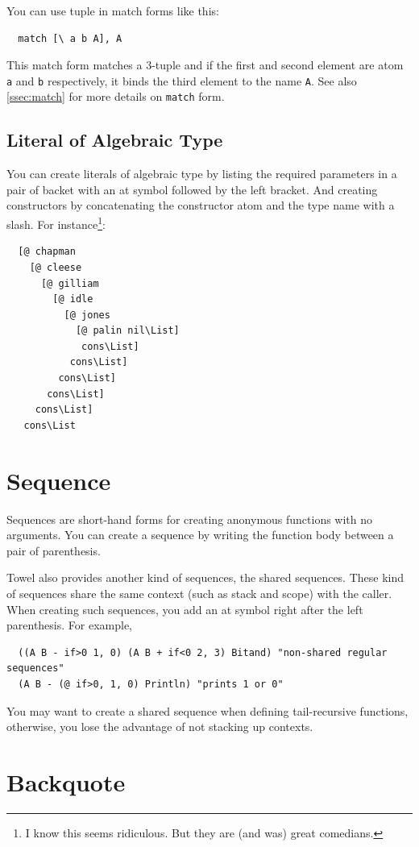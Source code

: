 \documentclass{book}
\begin{document}
You can use tuple in match forms like this:
\begin{verbatim}
  match [\ a b A], A
\end{verbatim}
This match form matches a 3-tuple and if the first and second element are atom \texttt{a} and \texttt{b} respectively, it binds the third element to the name \texttt{A}. See also \autoref{ssec:match} for more details on \texttt{match} form.

\subsection{Literal of Algebraic Type}

You can create literals of algebraic type by listing the required parameters in a pair of backet with an at symbol followed by the left bracket. And creating constructors by concatenating the constructor atom and the type name with a slash. For instance\footnote{I know this seems ridiculous. But they are (and was) great comedians.}:
\begin{verbatim}
  [@ chapman
    [@ cleese
      [@ gilliam
        [@ idle
          [@ jones
            [@ palin nil\List]
             cons\List]
           cons\List]
         cons\List]
       cons\List]
     cons\List]
   cons\List
\end{verbatim}

\section{Sequence}

Sequences are short-hand forms for creating anonymous functions with no arguments. You can create a sequence by writing the function body between a pair of parenthesis.

Towel also provides another kind of sequences, the shared sequences. These kind of sequences share the same context (such as stack and scope) with the caller. When creating such sequences, you add an at symbol right after the left parenthesis. For example,
\begin{verbatim}
  ((A B - if>0 1, 0) (A B + if<0 2, 3) Bitand) "non-shared regular sequences"
  (A B - (@ if>0, 1, 0) Println) "prints 1 or 0"
\end{verbatim}

You may want to create a shared sequence when defining tail-recursive functions, otherwise, you lose the advantage of not stacking up contexts.

\section{Backquote}
\end{document}
